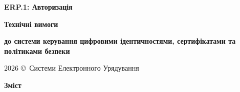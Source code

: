 \documentclass{article}
\newcommand\HUGE[1]{\fontsize{40}{40}\selectfont #1}
\begin{document}
\pagestyle{fancy}

\begin{titlepage}
  \AddToShipoutPictureBG*{\AtPageLowerLeft{\color{nato}\rule{\paperwidth}{\paperheight}}}
  \color{white}\thispagestyle{empty}\vspace*{4cm}\centering
  {\Huge \textbf{ERP.1: Авторизація} \par} \vspace{2cm}
  {\HUGE \textbf{Технічні вимоги} \par} \vspace{2.5cm}
  {\LARGE \textbf{до системи керування цифровими ідентичностями, сертифікатами та політиками безпеки} \par} \vspace{2.5cm}
  \vfill
  {\large 2026 \copyright\ Системи Електронного Урядування \par}
\end{titlepage}

\newpage
\begin{center}{\Huge\color{nato}\bfseries Зміст\par}\end{center}
\vspace{40pt}
\tableofcontents

\begin{abstract}
ERP.1: Служба ідентифікації та авторизації (IAS) є центральним керуючим компонентом безпеки Zencrypted-середовища на базі Erlang/OTP. Поточна реалізація веде стійкий реєстр доменних об'єктів у KVS/Mnesia, підтримує граф зв'язків користувач--пристрій--сертифікат--профіль безпеки--VPN-сервіс, перевірку CSR і X.509, покрокове налаштування пристрою, доставку бажаного стану до VPN через Erlang RPC, ревізії, аудит доставки, звіряння стану та відновлення після збоїв. Інтеграція з CA у поточній версії містить перехідний CMP-шлях через зовнішній командний інтерфейс OpenSSL; цільовою є повне усунення запуску OpenSSL із середовища виконання IAS та взаємодія з CA через керований клієнт або сервісний адаптер. Вимоги щодо BPE/BPMN, EST/CMC, CRL/OCSP, КСЗІ, КЕП та національних криптографічних алгоритмів у цьому документі позначаються окремо як цільові або нормативні вимоги і не трактуються як уже реалізовані функції.
\end{abstract}

\newpage
\end{document}
